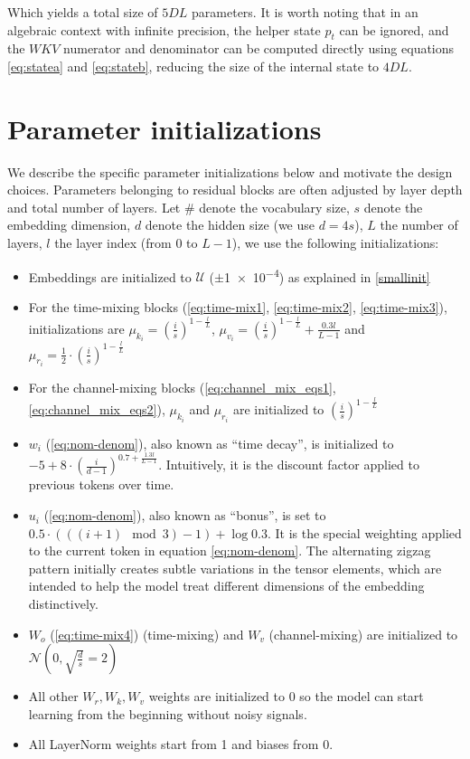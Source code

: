 \documentclass[11pt]{article}
\begin{document}
Which yields a total size of $5DL$ parameters. It is worth noting that in an algebraic context with infinite precision, the helper state $p_t$ can be ignored, and the $WKV$ numerator and denominator can be computed directly using equations \eqref{eq:statea} and \eqref{eq:stateb}, reducing the size of the internal state to $4DL$.

\section{Parameter initializations}
\label{sec:initialization_formulas}

We describe the specific parameter initializations below and motivate the design choices. Parameters belonging to residual blocks are often adjusted by layer depth and total number of layers. Let $\#$ denote the vocabulary size, $s$ denote the embedding dimension, $d$ denote the hidden size (we use $d=4s$), $L$ the number of layers, $l$ the layer index (from 0 to $L-1$), we use the following initializations:
\begin{itemize}
    \item Embeddings are initialized to $\mathcal{U}$ ($\pm$\num{1e-4}) as explained in \ref{smallinit}
    \item For the time-mixing blocks (\ref{eq:time-mix1}, \ref{eq:time-mix2}, \ref{eq:time-mix3}), initializations are
    $\mu_{k_i} = (\frac{i}{s})^{1-\frac{l}{L}}$,
    $\mu_{v_i} = (\frac{i}{s})^{1-\frac{l}{L}} + \frac{0.3l}{L-1}$ and $\mu_{r_i} = \frac{1}{2} \cdot (\frac{i}{s})^{1-\frac{l}{L}}$
    \item For the channel-mixing blocks (\ref{eq:channel_mix_eqs1}, \ref{eq:channel_mix_eqs2}), $\mu_{k_i}$ and $\mu_{r_i}$ are initialized to $(\frac{i}{s})^{1-\frac{l}{L}}$
    \item $w_i$ (\ref{eq:nom-denom}), also known as ``time decay'', is initialized to $-5 + 8 \cdot (\frac{i}{d-1})^{0.7+\frac{1.3l}{L-1}}$. Intuitively, it is the discount factor applied to previous tokens over time.  
        \item $u_i$ (\ref{eq:nom-denom}), also known as ``bonus'', is set to $0.5 \cdot (((i+1) \mod 3) - 1) + \log0.3$. It is the special weighting applied to the current token in equation \ref{eq:nom-denom}. The alternating zigzag pattern initially creates subtle variations in the tensor elements, which are intended to help the model treat different dimensions of the embedding distinctively.
    \item $W_o$ (\ref{eq:time-mix4}) (time-mixing) and $W_v$ (channel-mixing) are initialized to $\mathcal{N}(0, \sqrt{\frac{d}{s}}=2)$ %
    \item All other $W_r, W_k, W_v$ weights are initialized to 0 so the model can start learning from the beginning without noisy signals. 
    \item All LayerNorm weights start from 1 and biases from 0.
\end{itemize}
\end{document}
